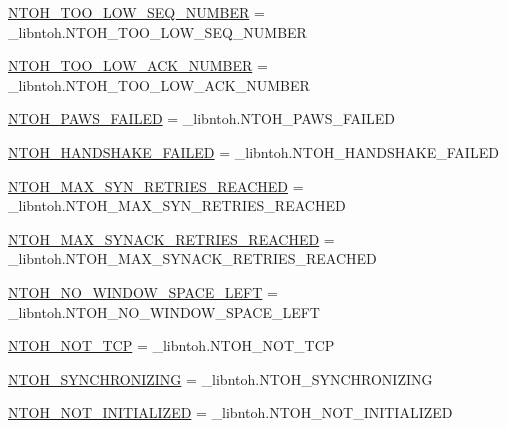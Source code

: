 \begin{DoxyCompactItemize}
\hyperlink{namespacelibntoh_a090e7fc9153541430bde30bc703f79df}{N\-T\-O\-H\-\_\-\-T\-O\-O\-\_\-\-L\-O\-W\-\_\-\-S\-E\-Q\-\_\-\-N\-U\-M\-B\-E\-R} = \-\_\-libntoh.\-N\-T\-O\-H\-\_\-\-T\-O\-O\-\_\-\-L\-O\-W\-\_\-\-S\-E\-Q\-\_\-\-N\-U\-M\-B\-E\-R
\item 
\hyperlink{namespacelibntoh_a40be8dbbc81f1c5193d4f35306a50344}{N\-T\-O\-H\-\_\-\-T\-O\-O\-\_\-\-L\-O\-W\-\_\-\-A\-C\-K\-\_\-\-N\-U\-M\-B\-E\-R} = \-\_\-libntoh.\-N\-T\-O\-H\-\_\-\-T\-O\-O\-\_\-\-L\-O\-W\-\_\-\-A\-C\-K\-\_\-\-N\-U\-M\-B\-E\-R
\item 
\hyperlink{namespacelibntoh_a523ba2e143ebfef17a4aa94e11a0dc28}{N\-T\-O\-H\-\_\-\-P\-A\-W\-S\-\_\-\-F\-A\-I\-L\-E\-D} = \-\_\-libntoh.\-N\-T\-O\-H\-\_\-\-P\-A\-W\-S\-\_\-\-F\-A\-I\-L\-E\-D
\item 
\hyperlink{namespacelibntoh_a2b7441bfc6d1c807b5f4dfe0bd9b4567}{N\-T\-O\-H\-\_\-\-H\-A\-N\-D\-S\-H\-A\-K\-E\-\_\-\-F\-A\-I\-L\-E\-D} = \-\_\-libntoh.\-N\-T\-O\-H\-\_\-\-H\-A\-N\-D\-S\-H\-A\-K\-E\-\_\-\-F\-A\-I\-L\-E\-D
\item 
\hyperlink{namespacelibntoh_a9b70cdf8cc67d04381f68fb9e3c0d484}{N\-T\-O\-H\-\_\-\-M\-A\-X\-\_\-\-S\-Y\-N\-\_\-\-R\-E\-T\-R\-I\-E\-S\-\_\-\-R\-E\-A\-C\-H\-E\-D} = \-\_\-libntoh.\-N\-T\-O\-H\-\_\-\-M\-A\-X\-\_\-\-S\-Y\-N\-\_\-\-R\-E\-T\-R\-I\-E\-S\-\_\-\-R\-E\-A\-C\-H\-E\-D
\item 
\hyperlink{namespacelibntoh_a1db93cb81fd45c16b3cb1e851bd77061}{N\-T\-O\-H\-\_\-\-M\-A\-X\-\_\-\-S\-Y\-N\-A\-C\-K\-\_\-\-R\-E\-T\-R\-I\-E\-S\-\_\-\-R\-E\-A\-C\-H\-E\-D} = \-\_\-libntoh.\-N\-T\-O\-H\-\_\-\-M\-A\-X\-\_\-\-S\-Y\-N\-A\-C\-K\-\_\-\-R\-E\-T\-R\-I\-E\-S\-\_\-\-R\-E\-A\-C\-H\-E\-D
\item 
\hyperlink{namespacelibntoh_a771ce84a838de6472c1dfe47c13b318e}{N\-T\-O\-H\-\_\-\-N\-O\-\_\-\-W\-I\-N\-D\-O\-W\-\_\-\-S\-P\-A\-C\-E\-\_\-\-L\-E\-F\-T} = \-\_\-libntoh.\-N\-T\-O\-H\-\_\-\-N\-O\-\_\-\-W\-I\-N\-D\-O\-W\-\_\-\-S\-P\-A\-C\-E\-\_\-\-L\-E\-F\-T
\item 
\hyperlink{namespacelibntoh_ac70195fbfa0ff71fb933f4317a283458}{N\-T\-O\-H\-\_\-\-N\-O\-T\-\_\-\-T\-C\-P} = \-\_\-libntoh.\-N\-T\-O\-H\-\_\-\-N\-O\-T\-\_\-\-T\-C\-P
\item 
\hyperlink{namespacelibntoh_afbcc1455609b556bee75edbceda81f14}{N\-T\-O\-H\-\_\-\-S\-Y\-N\-C\-H\-R\-O\-N\-I\-Z\-I\-N\-G} = \-\_\-libntoh.\-N\-T\-O\-H\-\_\-\-S\-Y\-N\-C\-H\-R\-O\-N\-I\-Z\-I\-N\-G
\item 
\hyperlink{namespacelibntoh_a4a0888c6a4c479caa753851708025290}{N\-T\-O\-H\-\_\-\-N\-O\-T\-\_\-\-I\-N\-I\-T\-I\-A\-L\-I\-Z\-E\-D} = \-\_\-libntoh.\-N\-T\-O\-H\-\_\-\-N\-O\-T\-\_\-\-I\-N\-I\-T\-I\-A\-L\-I\-Z\-E\-D

\end{DoxyCompactItemize}
